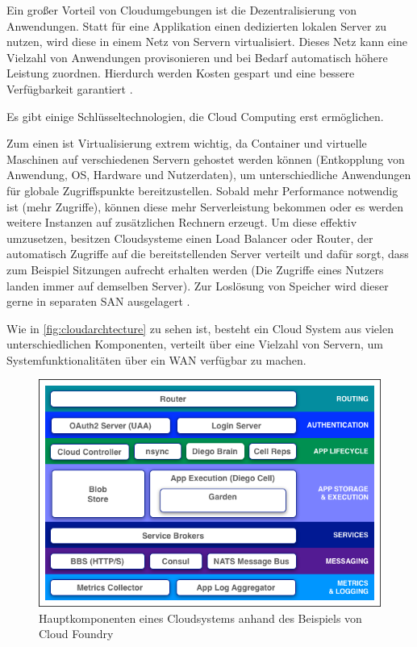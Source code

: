 Ein großer Vorteil von Cloudumgebungen ist die Dezentralisierung von Anwendungen. Statt für eine Applikation einen dedizierten lokalen Server zu nutzen, wird diese in einem Netz von Servern virtualisiert. Dieses Netz kann eine Vielzahl von Anwendungen provisonieren und bei Bedarf automatisch höhere Leistung zuordnen. Hierdurch werden Kosten gespart und eine bessere Verfügbarkeit garantiert \parencite[S. 7]{furth.2010}.

Es gibt einige Schlüsseltechnologien, die Cloud Computing erst ermöglichen. 

Zum einen ist Virtualisierung extrem wichtig, da Container und virtuelle Maschinen auf verschiedenen Servern gehostet werden können (Entkopplung von Anwendung, OS, Hardware und Nutzerdaten), um unterschiedliche Anwendungen für globale Zugriffspunkte bereitzustellen. 
Sobald mehr Performance notwendig ist (mehr Zugriffe), können diese mehr Serverleistung bekommen oder es werden weitere Instanzen auf zusätzlichen Rechnern erzeugt.
Um diese effektiv umzusetzen, besitzen Cloudsysteme einen Load Balancer oder Router, der automatisch Zugriffe auf die bereitstellenden Server verteilt und dafür sorgt, dass zum Beispiel Sitzungen aufrecht erhalten werden (Die Zugriffe eines Nutzers landen immer auf demselben Server).
Zur Loslösung von Speicher wird dieser gerne in separaten \acs{SAN} ausgelagert \parencite[S. 22]{rafaels.2015}.

Wie in \autoref{fig:cloudarchtecture} zu sehen ist, besteht ein Cloud System aus vielen unterschiedlichen Komponenten, verteilt über eine Vielzahl von Servern, um Systemfunktionalitäten über ein \ac{WAN} verfügbar zu machen.   

\begin{figure}[hbt]
	\centering
	\includegraphics[scale=0.75]{images/cloud-architecture}
	\caption{Hauptkomponenten eines Cloudsystems anhand des Beispiels von Cloud Foundry  \parencite{cloudfoundry.2017}}
	\label{fig:cloudarchtecture}
\end{figure}


